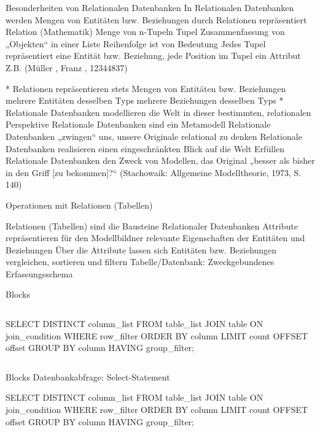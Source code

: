 \begin{frame}[allowframebreaks]{Besonderheiten von Relationalen Datenbanken}
In Relationalen Datenbanken werden Mengen von Entitäten bzw. Beziehungen durch Relationen repräsentiert
Relation (Mathematik)
Menge von n-Tupeln
Tupel
Zusammenfassung von „Objekten“ in einer Liste
Reihenfolge ist von Bedeutung
Jedes Tupel repräsentiert eine Entität bzw. Beziehung, jede Position im Tupel ein Attribut
Z.B. (Müller , Franz , 12344837)

* Relationen repräsentieren stets Mengen von Entitäten bzw. Beziehungen
mehrere Entitäten desselben Typs
mehrere Beziehungen desselben Typs
* Relationale Datenbanken modellieren die Welt in dieser bestimmten, relationalen Perspektive
Relationale Datenbanken sind ein Metamodell
Relationale Datenbanken „zwingen“ uns, unsere Originale relational zu denken
Relationale Datenbanken realisieren einen eingeschränkten Blick auf die Welt
Erfüllen Relationale Datenbanken den Zweck von Modellen, das Original „besser als bisher in den Griff [zu bekommen]?“ (Stachowaik: Allgemeine Modelltheorie, 1973, S. 140)


Operationen mit Relationen (Tabellen)

Relationen (Tabellen) sind die Bausteine Relationaler Datenbanken
Attribute repräsentieren für den Modellbildner relevante Eigenschaften der Entitäten und Beziehungen
Über die Attribute lassen sich Entitäten bzw. Beziehungen vergleichen, sortieren und filtern
Tabelle/Datenbank: Zweckgebundenes Erfassungsschema

\end{frame}


\begin{frame}[fragile]{Blocks}
  \begin{columns}[T,onlytextwidth]

\begin{sqlcode}
SELECT DISTINCT column_list
FROM table_list
    JOIN table ON join_condition
WHERE row_filter
ORDER BY column
LIMIT count OFFSET offset
GROUP BY column
HAVING group_filter;
\end{sqlcode}

  \end{columns}
\end{frame}


\begin{frame}[fragile]{Blocks}
    Datenbankabfrage: Select-Statement
\begin{sqlcode}
SELECT DISTINCT column_list
FROM table_list
	JOIN table ON join_condition
WHERE row_filter
ORDER BY column
LIMIT count OFFSET offset
GROUP BY column
HAVING group_filter;
\end{sqlcode}
\end{frame}



